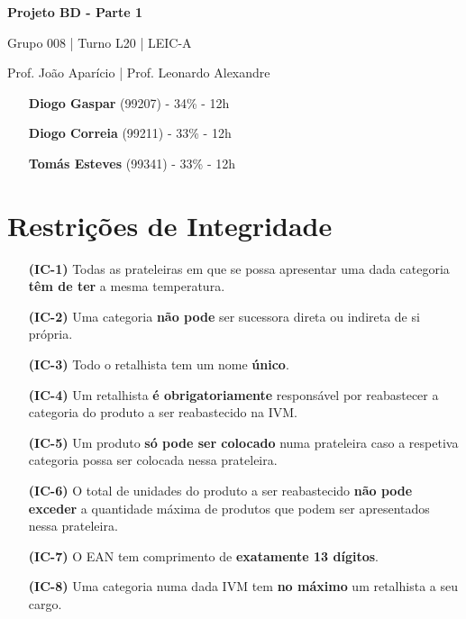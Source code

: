 \documentclass[12pt,a4paper]{article}
\begin{document}
  \begin{titlepage}
    \begin{center}
      \vspace*{5cm}
    
      \Huge
      \textbf{Projeto BD - Parte 1}

      \vspace{0.5cm}
      \LARGE
      Grupo 008 | Turno L20 | LEIC-A

      \vspace{0.5cm}
      \large
      Prof. João Aparício | Prof. Leonardo Alexandre

      \vfill
    \end{center}
    \large
    \begin{itemize}
      \item[] \textbf{Diogo Gaspar} (99207) - 34\% - 12h
      \item[] \textbf{Diogo Correia} (99211) - 33\% - 12h
      \item[] \textbf{Tomás Esteves} (99341) - 33\% - 12h
    \end{itemize}
  \end{titlepage}

  \begin{landscape}
    
  \end{landscape}

  \section*{Restrições de Integridade}
  \footnotesize
  \begin{itemize}
    \item[\textbf{(IC-1)}] Todas as prateleiras em que se possa apresentar uma dada categoria
      \textbf{têm de ter} a mesma temperatura.
		\item[\textbf{(IC-2)}] Uma categoria \textbf{não pode} ser sucessora direta
			ou indireta de si própria.
		\item[\textbf{(IC-3)}] Todo o retalhista tem um nome \textbf{único}.
		\item[\textbf{(IC-4)}] Um retalhista \textbf{é obrigatoriamente} responsável por
			reabastecer a categoria do produto a ser reabastecido na IVM.
		\item[\textbf{(IC-5)}] Um produto \textbf{só pode ser colocado} numa prateleira
			caso a respetiva categoria possa ser colocada nessa prateleira.
		\item[\textbf{(IC-6)}] O total de unidades do produto a ser reabastecido
			\textbf{não pode exceder} a quantidade máxima de produtos que podem ser apresentados nessa prateleira.
		\item[\textbf{(IC-7)}] O EAN tem comprimento de \textbf{exatamente 13 dígitos}.
		\item[\textbf{(IC-8)}] Uma categoria numa dada IVM tem \textbf{no máximo}
			um retalhista a seu cargo.
  \end{itemize}
\end{document}

